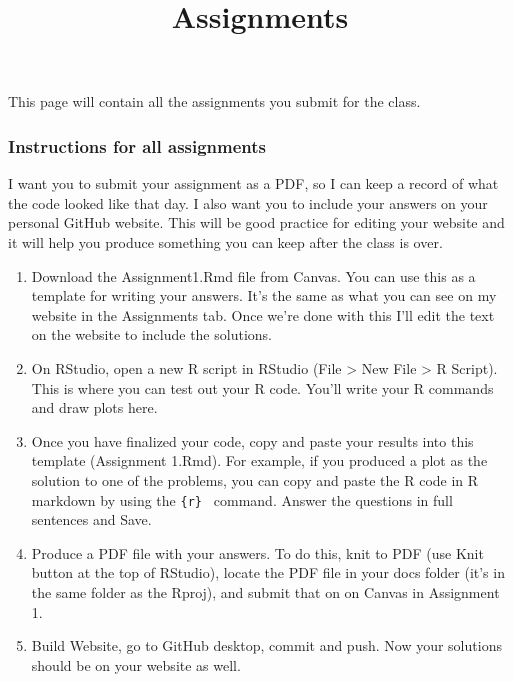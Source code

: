 \documentclass[
]{article}
\title{Assignments}
\author{}
\date{\vspace{-2.5em}}
\begin{document}
\maketitle

This page will contain all the assignments you submit for the class.

\hypertarget{instructions-for-all-assignments}{%
\subsubsection{Instructions for all
assignments}\label{instructions-for-all-assignments}}

I want you to submit your assignment as a PDF, so I can keep a record of
what the code looked like that day. I also want you to include your
answers on your personal GitHub website. This will be good practice for
editing your website and it will help you produce something you can keep
after the class is over.

\begin{enumerate}
\def\labelenumi{\arabic{enumi}.}
\item
  Download the Assignment1.Rmd file from Canvas. You can use this as a
  template for writing your answers. It's the same as what you can see
  on my website in the Assignments tab. Once we're done with this I'll
  edit the text on the website to include the solutions.
\item
  On RStudio, open a new R script in RStudio (File \textgreater{} New
  File \textgreater{} R Script). This is where you can test out your R
  code. You'll write your R commands and draw plots here.
\item
  Once you have finalized your code, copy and paste your results into
  this template (Assignment 1.Rmd). For example, if you produced a plot
  as the solution to one of the problems, you can copy and paste the R
  code in R markdown by using the
  \texttt{\textasciigrave{}\textasciigrave{}\{r\}\ \textasciigrave{}\textasciigrave{}\textasciigrave{}}
  command. Answer the questions in full sentences and Save.
\item
  Produce a PDF file with your answers. To do this, knit to PDF (use
  Knit button at the top of RStudio), locate the PDF file in your docs
  folder (it's in the same folder as the Rproj), and submit that on on
  Canvas in Assignment 1.
\item
  Build Website, go to GitHub desktop, commit and push. Now your
  solutions should be on your website as well.
\end{enumerate}
\end{document}
